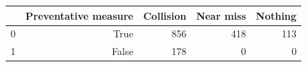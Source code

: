 \begin{tabular}{lrrrr}
\toprule
 & Preventative measure & Collision & Near miss & Nothing \\
\midrule
0 & True & 856 & 418 & 113 \\
1 & False & 178 & 0 & 0 \\
\bottomrule
\end{tabular}
